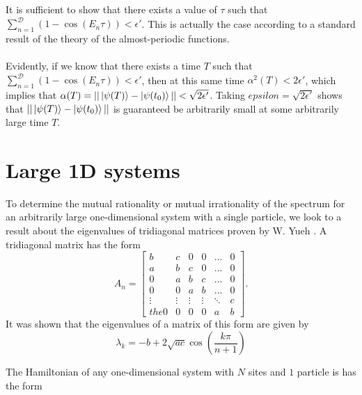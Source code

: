 \documentclass[a4paper,10pt]{article}
\begin{document}
It is sufficient to show that there exists a value of $\tau$ such that $\sum_{n=1}^\mathcal{D}\left(1-\cos\left(E_{n}\tau\right) \right)<\epsilon'$. This is actually the case 
according to a standard result of the theory of the almost-periodic functions.
\\\\
Evidently, if we know that there exists a time $T$ such that $\sum_{n=1}^\mathcal{D}\left(1-\cos\left(E_{n}\tau\right) \right)<\epsilon'$, then at this same time $\alpha^2(T)<2\epsilon'$, which implies 
that $\alpha(T)=||\ket{\psi(T)}-\ket{\psi(t_0)}||<\sqrt{2\epsilon'}$. Taking $epsilon=\sqrt{2\epsilon'}$ shows that $||\ket{\psi(T)}-\ket{\psi(t_0)}||$ is guaranteed be arbitrarily small at some 
arbitrarily large time $T$.

\section{Large 1D systems}
To determine the mutual rationality or mutual irrationality of the spectrum for an arbitrarily large one-dimensional system with a single particle, we look to a result about the eigenvalues
of tridiagonal matrices proven by W. Yueh \cite{Yueh2006}. A tridiagonal matrix has the form
\begin{equation}
 A_n= \begin{bmatrix}
 b & c & 0 & 0&\dots & 0\\
 a & b & c & 0&\dots & 0\\
 0 & a & b & c& \dots & 0\\
 0 & 0 & a & b& \dots & 0\\
 \vdots & \vdots & \vdots&\vdots & \ddots & c\\the
 0 & 0 & 0 & 0 & a & b
 \end{bmatrix}.
\end{equation}
It was shown that the eigenvalues of a matrix of this form are given by
\begin{equation}
 \lambda_k=-b+2\sqrt{ac}\cos\left(\frac{k\pi}{n+1}\right)
\end{equation}

The Hamiltonian of any one-dimensional system with $N$ sites and $1$ particle is has the form
\end{document}
